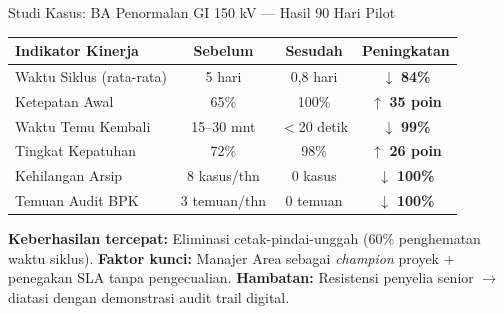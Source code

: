 \documentclass[aspectratio=169,11pt]{beamer}
\begin{document}
\begin{frame}{Studi Kasus: BA Penormalan GI 150 kV --- Hasil 90 Hari Pilot}
    \vspace{0.2cm}
    \begin{table}
        \centering
        \scriptsize
        \begin{tabularx}{\textwidth}{@{} X c c c @{}}
            \toprule
            \textbf{Indikator Kinerja} & \textbf{Sebelum} & \textbf{Sesudah} & \textbf{Peningkatan} \\
            \midrule
            Waktu Siklus (rata-rata) & 5 hari & 0,8 hari & $\downarrow$ \textbf{84\%} \\
            Ketepatan Awal & 65\% & 100\% & $\uparrow$ \textbf{35 poin} \\
            Waktu Temu Kembali & 15--30 mnt & $<$20 detik & $\downarrow$ \textbf{99\%} \\
            Tingkat Kepatuhan & 72\% & 98\% & $\uparrow$ \textbf{26 poin} \\
            Kehilangan Arsip & 8 kasus/thn & 0 kasus & $\downarrow$ \textbf{100\%} \\
            Temuan Audit BPK & 3 temuan/thn & 0 temuan & $\downarrow$ \textbf{100\%} \\
            \bottomrule
        \end{tabularx}
    \end{table}
    \vspace{0.2cm}
    \begin{greenbox}
        \scriptsize
        \textbf{Keberhasilan tercepat:} Eliminasi cetak-pindai-unggah (60\% penghematan waktu siklus). \quad
        \textbf{Faktor kunci:} Manajer Area sebagai \textit{champion} proyek + penegakan SLA tanpa pengecualian. \quad
        \textbf{Hambatan:} Resistensi penyelia senior $\rightarrow$ diatasi dengan demonstrasi audit trail digital.
    \end{greenbox}
\end{frame}
\end{document}
